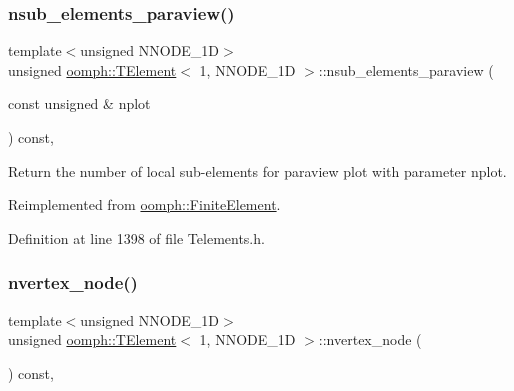 \subsubsection{\texorpdfstring{nsub\+\_\+elements\+\_\+paraview()}{nsub\_elements\_paraview()}}
{\footnotesize\ttfamily template$<$unsigned N\+N\+O\+D\+E\+\_\+1D$>$ \\
unsigned \hyperlink{classoomph_1_1TElement}{oomph\+::\+T\+Element}$<$ 1, N\+N\+O\+D\+E\+\_\+1D $>$\+::nsub\+\_\+elements\+\_\+paraview (\begin{DoxyParamCaption}\item[{const unsigned \&}]{nplot }\end{DoxyParamCaption}) const\hspace{0.3cm}{\ttfamily [inline]}, {\ttfamily [virtual]}}



Return the number of local sub-\/elements for paraview plot with parameter nplot. 



Reimplemented from \hyperlink{classoomph_1_1FiniteElement_aa1e11deffc8ee67adaa59ce3ade0579f}{oomph\+::\+Finite\+Element}.



Definition at line 1398 of file Telements.\+h.

\mbox{\label{classoomph_1_1TElement_3_011_00_01NNODE__1D_01_4_a3867e214d40e774ddfe31041b21d84c8}} 
\subsubsection{\texorpdfstring{nvertex\+\_\+node()}{nvertex\_node()}}
{\footnotesize\ttfamily template$<$unsigned N\+N\+O\+D\+E\+\_\+1D$>$ \\
unsigned \hyperlink{classoomph_1_1TElement}{oomph\+::\+T\+Element}$<$ 1, N\+N\+O\+D\+E\+\_\+1D $>$\+::nvertex\+\_\+node (\begin{DoxyParamCaption}{ }\end{DoxyParamCaption}) const\hspace{0.3cm}{\ttfamily [inline]}, {\ttfamily [virtual]}}




